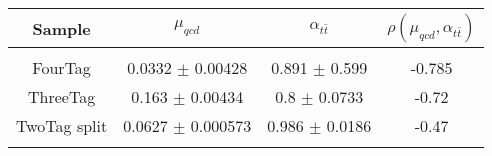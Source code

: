 \begin{footnotesize} 
\begin{tabular}{c|c|c|c} 
Sample & $\mu_{qcd}$ & $\alpha_{t\bar{t}}$ & $\rho(\mu_{qcd}, \alpha_{t\bar{t}})$ \\ 
\hline\hline 
& & & \\ 
FourTag & 0.0332 $\pm$ 0.00428 & 0.891 $\pm$ 0.599 & -0.785\\ 
ThreeTag & 0.163 $\pm$ 0.00434 & 0.8 $\pm$ 0.0733 & -0.72\\ 
TwoTag split & 0.0627 $\pm$ 0.000573 & 0.986 $\pm$ 0.0186 & -0.47\\ 
& & & \\ 
\hline\hline 
\end{tabular} 
\end{footnotesize} 
\newline 
